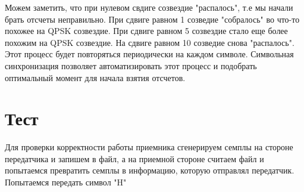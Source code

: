 Можем заметить, что при нулевом свдиге созвездие "распалось", т.е мы начали брать отсчеты неправильно. При сдвиге равном 1 
созведие "собралось" во что-то похожее на QPSK созвездие. При сдвиге равном 5 созвездие стало еще более похожим на QPSK созвездие.
На сдвиге равном 10 созведие снова "распалось". Этот процесс будет повторяться периодически на каждом символе. Символьная синхронизация
позволяет автоматизировать этот процесс и подобрать оптимальный момент для начала взятия отсчетов.

\section{Тест}

Для проверки корректности работы приемника сгенерируем семплы на стороне передатчика и запишем в файл, а на приемной стороне
считаем файл и попытаемся превратить семплы в информацию, которую отправлял передатчик. Попытаемся передать символ "H"

